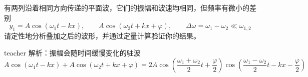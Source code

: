 \begin{example}
有两列沿着相同方向传递的平面波，它们的振幅和波速均相同，但频率有微小的差别
\[y_1 = A\cos(\omega_1 t-kx),\qquad A\cos(\omega_2 t + kx +\varphi),\qquad \Delta\omega = \omega_1-\omega_2\ll\omega_{1,2}\]
请定性地分析叠加之后的波形，并通过定量计算验证你的结果。
\begin{taggedblock}{teacher}
\newline
解析：振幅会随时间缓慢变化的驻波\[ A\cos(\omega_1 t-kx)+A\cos(\omega_2 t + kx +\varphi)=2A\cos(\frac{\omega_1+\omega_2}{2}t+\frac{\varphi}{2})\cos(\frac{\omega_1-\omega_2}{2}t-kx-\frac{\varphi}{2})\]

\end{taggedblock}
\end{example}



